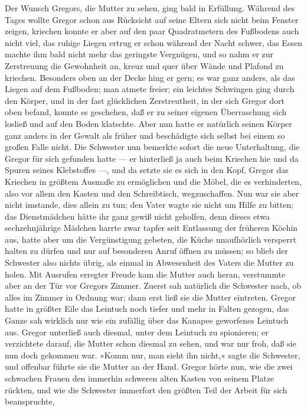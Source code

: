 Der Wunsch Gregors, die Mutter zu sehen, ging bald in Erfüllung. Während
des Tages wollte Gregor schon aus Rücksicht auf seine Eltern sich nicht
beim Fenster zeigen, kriechen konnte er aber auf den paar Quadratmetern
des Fußbodens auch nicht viel, das ruhige Liegen ertrug er schon während
der Nacht schwer, das Essen machte ihm bald nicht mehr das geringste
Vergnügen, und so nahm er zur Zerstreuung die Gewohnheit an, kreuz und
quer über Wände und Plafond zu kriechen. Besonders oben an der Decke
hing er gern; es war ganz anders, als das Liegen auf dem Fußboden; man
atmete freier; ein leichtes Schwingen ging durch den Körper, und in der
fast glücklichen Zerstreutheit, in der sich Gregor dort oben befand,
konnte es geschehen, daß er zu seiner eigenen Überraschung sich losließ
und auf den Boden klatschte. Aber nun hatte er natürlich seinen Körper
ganz anders in der Gewalt als früher und beschädigte sich selbst bei
einem so großen Falle nicht. Die Schwester nun bemerkte sofort die neue
Unterhaltung, die Gregor für sich gefunden hatte --- er hinterließ ja
auch beim Kriechen hie und da Spuren seines Klebstoffes ---, und da
setzte sie es sich in den Kopf, Gregor das Kriechen in größtem Ausmaße
zu ermöglichen und die Möbel, die es verhinderten, also vor allem den
Kasten und den Schreibtisch, wegzuschaffen. Nun war sie aber nicht
imstande, dies allein zu tun; den Vater wagte sie nicht um Hilfe zu
bitten; das Dienstmädchen hätte ihr ganz gewiß nicht geholfen, denn
dieses etwa sechzehnjährige Mädchen harrte zwar tapfer seit Entlassung
der früheren Köchin aus, hatte aber um die Vergünstigung gebeten, die
Küche unaufhörlich versperrt halten zu dürfen und nur auf besonderen
Anruf öffnen zu müssen; so blieb der Schwester also nichts übrig, als
einmal in Abwesenheit des Vaters die Mutter zu holen. Mit Ausrufen
erregter Freude kam die Mutter auch heran, verstummte aber an der Tür
vor Gregors Zimmer. Zuerst sah natürlich die Schwester nach, ob alles im
Zimmer in Ordnung war; dann erst ließ sie die Mutter eintreten. Gregor
hatte in größter Eile das Leintuch noch tiefer und mehr in Falten
gezogen, das Ganze sah wirklich nur wie ein zufällig über das Kanapee
geworfenes Leintuch aus. Gregor unterließ auch diesmal, unter dem
Leintuch zu spionieren; er verzichtete darauf, die Mutter schon diesmal
zu sehen, und war nur froh, daß sie nun doch gekommen war. »Komm nur,
man sieht ihn nicht,« sagte die Schwester, und offenbar führte sie die
Mutter an der Hand. Gregor hörte nun, wie die zwei schwachen Frauen den
immerhin schweren alten Kasten von seinem Platze rückten, und wie die
Schwester immerfort den größten Teil der Arbeit für sich beanspruchte,
